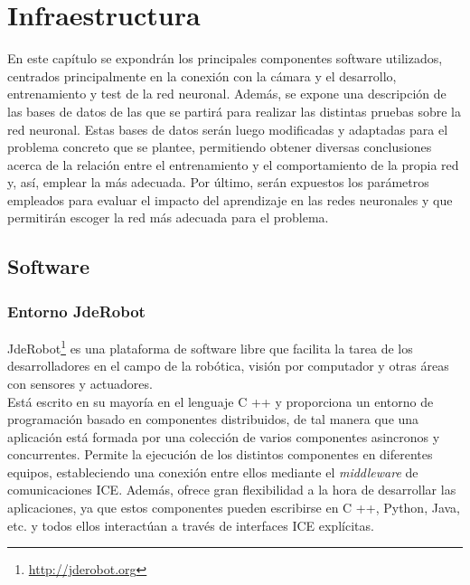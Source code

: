 \chapter{Infraestructura}\label{cap.infraestructura}
En este capítulo se expondrán los principales componentes software utilizados, centrados principalmente en la conexión con la cámara y el desarrollo, entrenamiento y test de la red neuronal. Además, se expone una descripción de las bases de datos de las que se partirá para realizar las distintas pruebas sobre la red neuronal. Estas bases de datos serán luego modificadas y adaptadas para el problema concreto que se plantee, permitiendo obtener diversas conclusiones acerca de la relación entre el entrenamiento y el comportamiento de la propia red y, así, emplear la más adecuada. Por último, serán expuestos los parámetros empleados para evaluar el impacto del aprendizaje en las redes neuronales y que permitirán escoger la red más adecuada para el problema.

\section{Software}

\subsection{Entorno JdeRobot}\label{sec.jderobot}
JdeRobot\footnote{\url{http://jderobot.org}} es una plataforma de software libre que facilita la tarea de los desarrolladores en el campo de la robótica, visión por computador y otras áreas con sensores y actuadores.\\ 

Está escrito en su mayoría en el lenguaje C ++ y proporciona un entorno de programación basado en componentes distribuidos, de tal manera que una aplicación está formada por una colección de varios componentes asincronos y concurrentes. Permite la ejecución de los distintos componentes en diferentes equipos, estableciendo una conexión entre ellos mediante el \textit{middleware} de comunicaciones ICE. Además, ofrece gran flexibilidad a la hora de desarrollar las aplicaciones, ya que estos componentes pueden escribirse en C ++, Python, Java, etc. y todos ellos interactúan a través de interfaces ICE explícitas.\\ 

